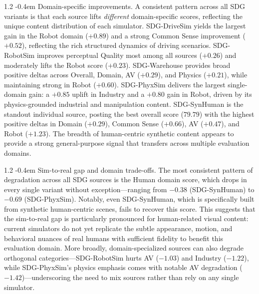 \documentclass{llmxive}
\makeatletter
\providecommand{\paragraph}{  \@startsection{paragraph}{4}{\z@}    {1\baselineskip \@plus .2\baselineskip}    {-0.4em}    {\normalfont\normalsize\bfseries}}
\makeatother
\begin{document}
\paragraph{Domain-specific improvements.}
A consistent pattern across all SDG variants is that each source lifts
\emph{different} domain-specific scores, reflecting the unique content
distribution of each simulator.
SDG-DriveSim yields the largest
gain in the Robot domain ($+0.89$) and a strong Common Sense improvement
($+0.52$), reflecting the rich structured dynamics of driving scenarios.
SDG-RobotSim improves perceptual Quality most among all sources ($+0.26$) and
moderately lifts the Robot score ($+0.23$). SDG-Warehouse provides broad
positive deltas across Overall, Domain, AV ($+0.29$), and Physics ($+0.21$),
while maintaining strong in Robot ($+0.60$). SDG-PhyxSim delivers the
largest single-domain gain: a $+0.85$ uplift in Industry and a $+0.80$ gain in
Robot, driven by its physics-grounded industrial and manipulation content.
SDG-SynHuman is the standout individual source, posting the best overall score
($79.79$) with the highest positive deltas in Domain ($+0.29$), Common Sense
($+0.66$), AV ($+0.47$), and Robot ($+1.23$). The breadth of human-centric synthetic content appears to
provide a strong general-purpose signal that transfers across multiple
evaluation domains.

\paragraph{Sim-to-real gap and domain trade-offs.}
The most consistent pattern of degradation across all SDG sources is the Human
domain score, which drops in every single variant without exception---ranging
from $-0.38$ (SDG-SynHuman) to $-0.69$ (SDG-PhyxSim). Notably, even
SDG-SynHuman, which is specifically built from synthetic human-centric scenes,
fails to recover this score. This suggests that the sim-to-real gap is
particularly pronounced for human-related visual content: current simulators do
not yet replicate the subtle appearance, motion, and behavioral nuances of real
humans with sufficient fidelity to benefit this evaluation domain. More broadly,
domain-specialized sources can also degrade orthogonal categories---SDG-RobotSim
hurts AV ($-1.03$) and Industry ($-1.22$), while SDG-PhyxSim's physics emphasis
comes with notable AV degradation ($-1.42$)---underscoring the need to mix
sources rather than rely on any single simulator.
\end{document}
